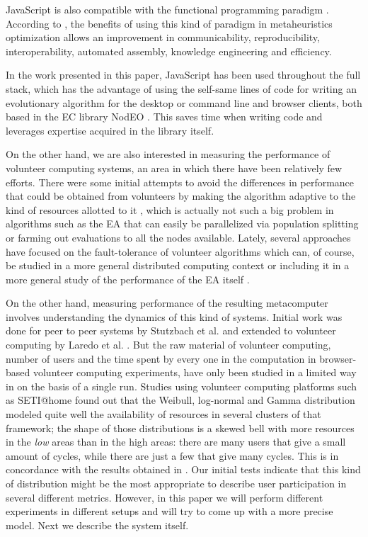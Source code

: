 \documentclass[journal,onecolumn]{IEEEtran}
\begin{document}
JavaScript is also compatible with the functional programming paradigm \cite{Cousineau1998,MacLennan1990,Thompson1996}.
According to \cite{swanresearch2015}, the benefits of using this kind of paradigm in
metaheuristics optimization allows an improvement in communicability,
reproducibility, interoperability, automated assembly, knowledge engineering
and efficiency.

In the work presented in this paper, JavaScript has been used throughout the full
stack, which has the advantage of using the self-same lines of code for
writing an evolutionary algorithm for the
desktop or command line and browser clients, both based in the EC
library NodEO \cite{DBLP:conf/gecco/GuervosVGES14}. This saves time 
when writing code and leverages 
expertise acquired in the library itself. 

On the other hand, we are also interested in measuring the performance
of volunteer computing systems, an area in which there have been
relatively few efforts.
There were some initial attempts to avoid the differences in performance
that could be obtained from volunteers  by making
the algorithm adaptive to the kind of resources allotted to it
\cite{milani2004online}, which is actually not such a big problem in
algorithms such as the EA that can easily be
parallelized via population splitting or farming out evaluations to all
the nodes available. Lately, several approaches have focused on the
fault-tolerance of volunteer algorithms
\cite{gonzalez2010characterizing} which can, of course, be studied in
a more general distributed computing context
\cite{nogueras2015studying} or including it in a more general study of the
performance of the EA itself
\cite{DBLP:journals/gpem/LaredoBGVAGF14}.

On the other hand, measuring performance of the resulting metacomputer
involves understanding the dynamics of this kind of systems. Initial
work was done for peer to peer systems by Stutzbach et
al. \cite{stutzbach2006understanding} and extended to volunteer
computing by Laredo et al. \cite{churn08,laredo2008rcp}. But the raw material of
volunteer computing, number of users and the time spent by every one in the
computation in browser-based volunteer computing experiments, have
only been studied in a limited way in 
\cite{DBLP:journals/gpem/LaredoBGVAGF14} on the basis of a single
run. Studies using volunteer computing platforms such as SETI@home
\cite{javadi2009mining} found out that the Weibull, log-normal and
Gamma distribution 
modeled quite well the availability of resources in several clusters
of that framework; the shape of those distributions is a skewed bell
with more resources in the {\em low} areas than in the high areas:
there are many users that give a small amount of cycles, while there
are just a few that give many cycles. This is in concordance with the
results obtained in \cite{agajaj}. Our initial tests indicate that
this kind of distribution might be the most appropriate to describe
user participation in several different metrics. However, in this
paper we will perform different experiments in different setups and
will try to come up with a more precise model. Next we describe the
system itself.
\end{document}
